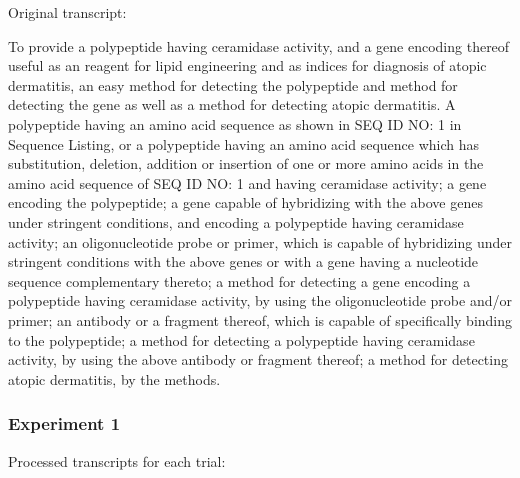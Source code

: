 \documentclass{article}
\begin{document}
Original transcript:

\begin{displayquote}
To provide a polypeptide having ceramidase activity, and a gene encoding thereof useful as an reagent for lipid engineering and as indices for diagnosis of atopic dermatitis, an easy method for detecting the polypeptide and method for detecting the gene as well as a method for detecting atopic dermatitis. A polypeptide having an amino acid sequence as shown in SEQ ID NO: 1 in Sequence Listing, or a polypeptide having an amino acid sequence which has substitution, deletion, addition or insertion of one or more amino acids in the amino acid sequence of SEQ ID NO: 1 and having ceramidase activity; a gene encoding the polypeptide; a gene capable of hybridizing with the above genes under stringent conditions, and encoding a polypeptide having ceramidase activity; an oligonucleotide probe or primer, which is capable of hybridizing under stringent conditions with the above genes or with a gene having a nucleotide sequence complementary thereto; a method for detecting a gene encoding a polypeptide having ceramidase activity, by using the oligonucleotide probe and/or primer; an antibody or a fragment thereof, which is capable of specifically binding to the polypeptide; a method for detecting a polypeptide having ceramidase activity, by using the above antibody or fragment thereof; a method for detecting atopic dermatitis, by the methods. 
\end{displayquote}\subsubsection{Experiment 1}

Processed transcripts for each trial:
\end{document}
